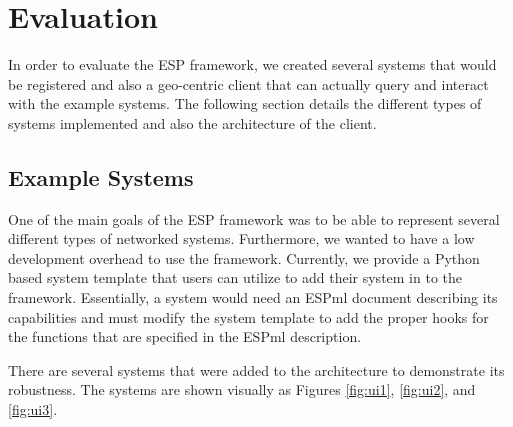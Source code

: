 \section{Evaluation} In order to evaluate the ESP framework, we created several systems that would be registered and also a geo-centric client that can actually query and interact with the
example systems. The following section details the different types of systems implemented and also the architecture of the client.

\subsection{Example Systems}
One of the main goals of the ESP framework was to be able to represent several different types of networked systems.  Furthermore, we wanted to have a low development overhead to use the
framework.  Currently, we provide a Python based system template that users can utilize to add their system in to the framework.  Essentially, a system would need an ESPml document describing its 
capabilities and must modify the system template to add the proper hooks for the functions that are specified in the ESPml description.

There are several systems that were added to the architecture to demonstrate its robustness.  The systems are shown visually as Figures \ref{fig:ui1}, \ref{fig:ui2}, and \ref{fig:ui3}.

